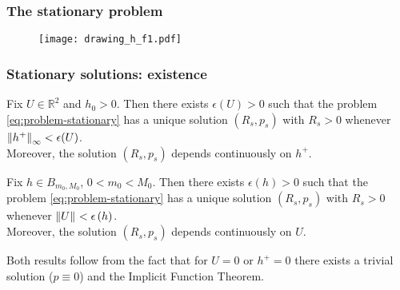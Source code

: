 \documentclass[10pt,aspectratio=169]{beamer}
\begin{document}
\begin{frame}
\frametitle{The stationary problem}

\begin{figure}[h]
	\texttt{[image: drawing\_h\_f1.pdf]}
\end{figure}

\end{frame} 


\begin{frame}
\frametitle{Stationary solutions: existence}
\begin{theorem}\label{theo:existence_U_fix}
	Fix $U\in\mathbb{R}^2$ and $h_0>0$. Then there exists $\epsilon\left(U\right)>0$ such that the problem \eqref{eq:problem-stationary} has a unique solution $\left(R_s,p_s\right)$ with $R_s>0$ whenever $\left\lVert h^+\right\rVert_{\infty}<\epsilon(U)$.\\ {\color{red}Moreover, the solution $\left(R_s,p_s\right)$ depends continuously on $h^+$}.
\end{theorem}
\begin{theorem}\label{theo:existence_h_fix}
	Fix $h\in B_{m_0,M_0}$, $0<m_0<M_0$. Then there exists $\epsilon\left(h\right)>0$ such that the problem \eqref{eq:problem-stationary} has a unique solution $\left(R_s,p_s\right)$ with $R_s>0$ whenever $\left\lVert U\right\rVert_{}<\epsilon\left(h\right)$.\\  {\color{red}Moreover, the solution $\left(R_s,p_s\right)$ depends continuously on $U$}.
\end{theorem}
\bigskip

Both results follow from the fact that for $U=0$ or $h^+=0$ there exists a trivial solution ($p\equiv0$) and the Implicit Function Theorem.
\end{frame} 
\end{document}
